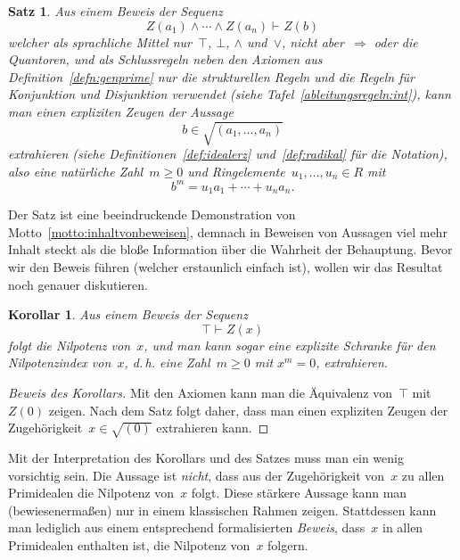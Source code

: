 \documentclass[a4paper,ngerman,12pt]{scrartcl}
\theoremstyle{definition}
\theoremstyle{plain}
\newtheorem{kor}[defn]{Korollar}
\newtheorem{satz}[defn]{Satz}
\theoremstyle{remark}
\newcommand{\seq}[1]{\mathrel{\vdash\!\!\!_{#1}}}
\renewcommand{\_}{\mathpunct{.}\,}
\newcommand{\?}{\,{:}\,}
\begin{document}
\begin{satz}\label{satz:genprime}Aus einem Beweis der Sequenz
\[ Z(a_1) \wedge \cdots \wedge Z(a_n) \seq{} Z(b) \]
welcher als sprachliche Mittel nur~$\top$, $\bot$, $\wedge$ und~$\vee$, nicht
aber~$\Rightarrow$ oder die Quantoren, und als Schlussregeln neben den Axiomen
aus Definition~\ref{defn:genprime} nur die
strukturellen Regeln und die Regeln für Konjunktion und Disjunktion verwendet (siehe
Tafel~\ref{ableitungsregeln:int}), kann man einen expliziten Zeugen der Aussage
\[ b \in \sqrt{(a_1,\ldots,a_n)} \]
extrahieren (siehe Definitionen~\ref{def:idealerz} und~\ref{def:radikal} für
die Notation), also eine natürliche Zahl~$m \geq 0$ und
Ringelemente~$u_1,\ldots,u_n \in R$ mit
\[ b^m = u_1 a_1 + \cdots + u_n a_n. \]
\end{satz}

Der Satz ist eine beeindruckende
Demonstration von Motto~\ref{motto:inhaltvonbeweisen}, demnach in
Beweisen von Aussagen viel mehr Inhalt steckt als die bloße Information
über die Wahrheit der Behauptung. Bevor wir den Beweis führen (welcher
erstaunlich einfach ist), wollen wir das Resultat noch genauer
diskutieren.

\begin{kor}Aus einem Beweis der Sequenz
\[ \top \seq{} Z(x) \]
folgt die Nilpotenz von~$x$, und man kann sogar eine explizite Schranke
für den Nilpotenzindex von~$x$, d.\,h. eine Zahl~$m \geq 0$ mit $x^m = 0$,
extrahieren.
\end{kor}
\begin{proof}[Beweis des Korollars] Mit den Axiomen kann man die Äquivalenz
von~$\top$ mit~$Z(0)$ zeigen. Nach dem Satz folgt daher, dass man einen
expliziten Zeugen der Zugehörigkeit~$x \in \sqrt{(0)}$ extrahieren
kann.\end{proof}

Mit der Interpretation des Korollars und des Satzes muss man ein wenig
vorsichtig sein. Die Aussage ist \emph{nicht}, dass aus der Zugehörigkeit
von~$x$ zu allen Primidealen die Nilpotenz von~$x$ folgt. Diese stärkere
Aussage kann man (bewiesenermaßen) nur in einem klassischen Rahmen zeigen.
Stattdessen kann man lediglich aus einem entsprechend formalisierten
\emph{Beweis}, dass~$x$ in allen Primidealen enthalten ist, die Nilpotenz
von~$x$ folgern.
\end{document}
